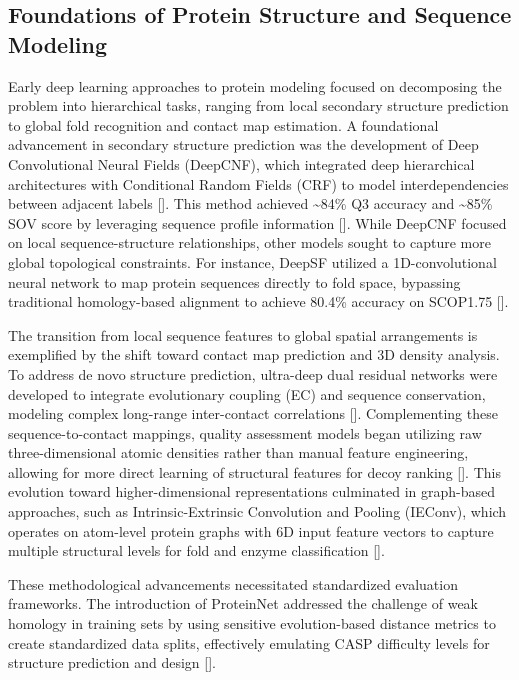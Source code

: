 \documentclass[11pt]{article}
\begin{document}
\subsection{Foundations of Protein Structure and Sequence Modeling}

Early deep learning approaches to protein modeling focused on decomposing the problem into hierarchical tasks, ranging from local secondary structure prediction to global fold recognition and contact map estimation. A foundational advancement in secondary structure prediction was the development of Deep Convolutional Neural Fields (DeepCNF), which integrated deep hierarchical architectures with Conditional Random Fields (CRF) to model interdependencies between adjacent labels [\citep{1512.00843}]. This method achieved \textasciitilde{}84\% Q3 accuracy and \textasciitilde{}85\% SOV score by leveraging sequence profile information [\citep{1512.00843}]. While DeepCNF focused on local sequence-structure relationships, other models sought to capture more global topological constraints. For instance, DeepSF utilized a 1D-convolutional neural network to map protein sequences directly to fold space, bypassing traditional homology-based alignment to achieve 80.4\% accuracy on SCOP1.75 [\citep{1706.01010}].

The transition from local sequence features to global spatial arrangements is exemplified by the shift toward contact map prediction and 3D density analysis. To address de novo structure prediction, ultra-deep dual residual networks were developed to integrate evolutionary coupling (EC) and sequence conservation, modeling complex long-range inter-contact correlations [\citep{1609.00680}]. Complementing these sequence-to-contact mappings, quality assessment models began utilizing raw three-dimensional atomic densities rather than manual feature engineering, allowing for more direct learning of structural features for decoy ranking [\citep{1801.06252}]. This evolution toward higher-dimensional representations culminated in graph-based approaches, such as Intrinsic-Extrinsic Convolution and Pooling (IEConv), which operates on atom-level protein graphs with 6D input feature vectors to capture multiple structural levels for fold and enzyme classification [\citep{2007.06252}].

These methodological advancements necessitated standardized evaluation frameworks. The introduction of ProteinNet addressed the challenge of weak homology in training sets by using sensitive evolution-based distance metrics to create standardized data splits, effectively emulating CASP difficulty levels for structure prediction and design [\citep{1902.00249}].
\end{document}
